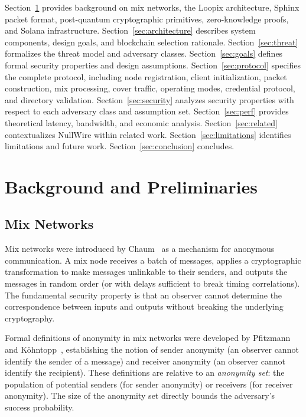 \documentclass[11pt]{article}
\theoremstyle{definition}
\theoremstyle{remark}
\begin{document}
Section~\ref{sec:background} provides background on mix networks, the Loopix architecture, Sphinx packet format, post-quantum cryptographic primitives, zero-knowledge proofs, and Solana infrastructure. Section~\ref{sec:architecture} describes system components, design goals, and blockchain selection rationale. Section~\ref{sec:threat} formalizes the threat model and adversary classes. Section~\ref{sec:goals} defines formal security properties and design assumptions. Section~\ref{sec:protocol} specifies the complete protocol, including node registration, client initialization, packet construction, mix processing, cover traffic, operating modes, credential protocol, and directory validation. Section~\ref{sec:security} analyzes security properties with respect to each adversary class and assumption set. Section~\ref{sec:perf} provides theoretical latency, bandwidth, and economic analysis. Section~\ref{sec:related} contextualizes NullWire within related work. Section~\ref{sec:limitations} identifies limitations and future work. Section~\ref{sec:conclusion} concludes.

\section{Background and Preliminaries}
\label{sec:background}

\subsection{Mix Networks}

Mix networks were introduced by Chaum~\cite{chaum1981} as a mechanism for anonymous communication. A mix node receives a batch of messages, applies a cryptographic transformation to make messages unlinkable to their senders, and outputs the messages in random order (or with delays sufficient to break timing correlations). The fundamental security property is that an observer cannot determine the correspondence between inputs and outputs without breaking the underlying cryptography.

Formal definitions of anonymity in mix networks were developed by Pfitzmann and K\"ohntopp~\cite{pfitzmann1999}, establishing the notion of sender anonymity (an observer cannot identify the sender of a message) and receiver anonymity (an observer cannot identify the recipient). These definitions are relative to an \emph{anonymity set}: the population of potential senders (for sender anonymity) or receivers (for receiver anonymity). The size of the anonymity set directly bounds the adversary's success probability.
\end{document}
